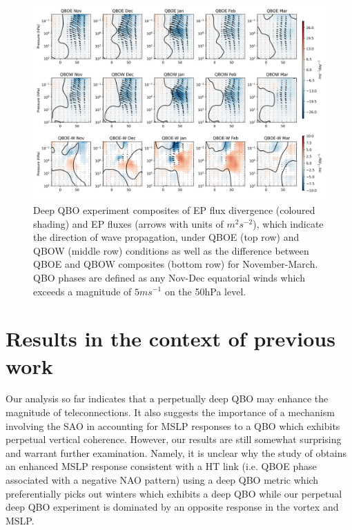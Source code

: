\begin{figure}[h!]
\begin{center}
\noindent\includegraphics[width = \linewidth]{Figures/Figures-deepQBO/EP_flux_composites_by_month_QBO_phases_d_higher_50hPa_5thresh.png}
\caption[EP flux composites under different QBO phases in the deep QBO simulation]{Deep QBO experiment composites of EP flux divergence (coloured shading) and EP fluxes (arrows with units of $m^2s^{-2}$), which indicate the direction of wave propagation, under QBOE (top row) and QBOW (middle row) conditions as well as the difference between QBOE and QBOW composites (bottom row) for November-March. QBO phases are defined as any Nov-Dec equatorial winds which exceeds a magnitude of $5ms^{-1}$ on the 50hPa level.}
\label{fig:EP_deep}
\end{center}
\end{figure}
\newpage

\section{Results in the context of previous work}
Our analysis so far indicates that a perpetually deep QBO may enhance the magnitude of teleconnections. It also suggests the importance of a mechanism involving the SAO in accounting for MSLP responses to a QBO which exhibits perpetual vertical coherence. However, our results are still somewhat surprising and warrant further examination. Namely, it is unclear why the study of \cite{andrewsObserved2019d} obtains an enhanced MSLP response consistent with a HT link (i.e. QBOE phase associated with a negative NAO pattern) using a deep QBO metric which preferentially picks out winters which exhibits a deep QBO while our perpetual deep QBO experiment is dominated by an opposite response in the vortex and MSLP. 

